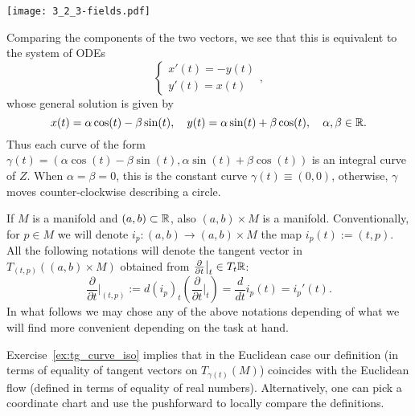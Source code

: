 \begin{example}
\begin{equation}
	\end{equation}
	\begin{marginfigure}
		\texttt{[image: 3\_2\_3-fields.pdf]}
	\end{marginfigure}
	\noindent Comparing the components of the two vectors, we see that this is equivalent to the system of ODEs
	\begin{equation}
		\begin{cases}
			x'(t) = - y(t) \\
			y'(t) = x(t)
		\end{cases},
	\end{equation}
	whose general solution is given by
	\begin{equation}
		x(t) = \alpha\cos(t) - \beta\sin(t), \quad
		y(t) = \alpha\sin(t) + \beta\cos(t), \quad \alpha,\beta\in\mathbb{R}.
	\end{equation}
	Thus each curve of the form $\gamma(t) = (\alpha\cos(t) -  \beta\sin(t), \alpha\sin(t) + \beta\cos(t))$ is an integral curve of $Z$.
	When $\alpha=\beta=0$, this is the constant curve $\gamma(t)\equiv (0,0)$, otherwise, $\gamma$ moves counter-clockwise describing a circle.
\end{example}

\begin{notation}
	If $M$ is a manifold and $(a,b)\subset\mathbb{R}$, also $(a,b)\times M$ is a manifold.
	Conventionally, for $p\in M$ we will denote $i_p : (a,b) \to (a,b)\times M$ the map $i_p(t) := (t,p)$.
	All the following notations will denote the tangent vector in $T_{(t,p)}((a,b)\times M)$ obtained from $\frac{\partial}{\partial t}\big|_t \in T_t\mathbb{R}$:
	\begin{equation}
		\frac{\partial}{\partial t}\Big|_{(t,p)} := d (i_p)_t\left(\frac{\partial}{\partial t}\Big|_t\right) = \frac{d}{d t}  i_p(t) = i_p'(t).
	\end{equation}
	In what follows we may chose any of the above notations depending of what we will find more convenient depending on the task at hand.
\end{notation}

Exercise~\ref{ex:tg_curve_iso} implies that in the Euclidean case our definition (in terms of equality of tangent vectors on $T_{\gamma(t)}(M)$) coincides with the Euclidean flow (defined in terms of equality of real numbers).
Alternatively, one can pick a coordinate chart and use the pushforward to locally compare the definitions.


